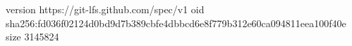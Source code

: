 version https://git-lfs.github.com/spec/v1
oid sha256:fd036f02124d0bd9d7b389cbfe4dbbcd6e8f779b312e60ca094811eea100f40e
size 3145824
